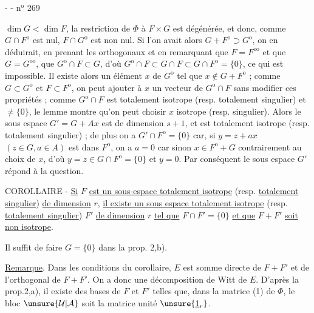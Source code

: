 -  - \hfill n$^{\mathrm{o}}$ 269

$\dim G<\dim F$, la restriction de $\Phi$ à $F\times G$ est dégénérée, et donc, comme $G\cap F^{\mathrm o}$ est nul, $F\cap G^{\mathrm o}$ est non nul. Si l'on avait alors $G+F^{\mathrm o}\supset G^{\mathrm o}$, on en déduirait, en prenant les orthogonaux et en remarquant que $F=F^{\mathrm{oo}}$ et que $G=G^{\mathrm{oo}}$, que $G^{\mathrm o}\cap F\subset G$, d'où $G^{\mathrm o}\cap F\subset G\cap F\subset G\cap F^{\mathrm o}=\{0\}$, ce qui est impossible. Il existe alors un élément $x$ de $G^{\mathrm o}$ tel que $x\notin G+F^{\mathrm o}$ ; comme $G\subset G^{\mathrm o}$ et $F\subset F^{\mathrm o}$, on peut ajouter à $x$ un vecteur de $G^{\mathrm o}\cap F$ sans modifier ces propriétés ; comme $G^{\mathrm o}\cap F$ est totalement isotrope (resp. totalement singulier) et $\ne\{0\}$, le lemme montre qu'on peut choisir $x$ isotrope (resp. singulier). Alors le sous espace $G'=G+Ax$ est de dimension $s+1$, et est totalement isotrope (resp. totalement singulier) ; de plus on a $G'\cap F^{\mathrm o}=\{0\}$ car, si $y=z+ax$ $(z\in G,a\in A)$ est dans $F^{\mathrm o}$, on a $a=0$ car sinon $x\in F^{\mathrm o}+G$ contrairement au choix de $x$, d'où $y=z\in G\cap F^{\mathrm o}=\{0\}$ et $y=0$. Par conséquent le sous espace $G'$ répond à la question.

COROLLAIRE - \uline{Si} $F$ \uline{est un sous-espace totalement isotrope} (resp. \uline{totalement singulier}) \uline{de dimension} $r$, \uline{il existe un sous espace totalement isotrope} (resp. \uline{totalement singulier}) $F'$ \uline{de dimension} $r$ \uline{tel que} $F\cap F'=\{0\}$ \uline{et que} $F+F'$ \uline{soit non isotrope}.

Il suffit de faire $G=\{0\}$ dans la prop. 2,b).

\uline{Remarque}. Dans les conditions du corollaire, $E$ est somme directe de $F+F'$ et de l'orthogonal de $F+F'$. On a donc une décomposition de Witt de $E$. D'après la prop.2,a), il existe des bases de $F$ et $F'$ telles que, dans la matrice (1) de $\Phi$, le bloc $\unsure{\mathcal U|\mathcal A}$ soit la matrice unité $\unsure{\underline{1}_r}$.
